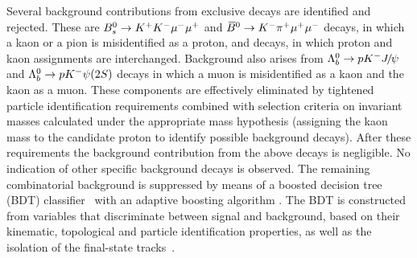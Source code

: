 Several background contributions from exclusive decays are identified and rejected.
These are ${{B}^0_{s}}\rightarrow {\ensuremath{{K}^+}}{\ensuremath{{K}^-}}\mu^-\mu^+$ and ${{\kern 0.18em\overline{\kern -0.18em B}{}}{}^0}\rightarrow {\ensuremath{{K}^-}} {\ensuremath{{\pi}^+}}{\ensuremath{\mu^+}}{\ensuremath{\mu^-}}$ decays, in which a kaon or a pion is
misidentified as a proton, and \LK decays, in which proton and kaon assignments are interchanged.
Background also arises from ${{\Lambda}^0_{b}}\rightarrow p{{K}^-} {{J\mskip -3mu/\mskip -2mu\psi\mskip 2mu}}$ and ${{\Lambda}^0_{b}}\rightarrow p {{K}^-} {\psi{(2S)}}$ decays in which a muon is misidentified as a kaon and the kaon as a muon.
These components are effectively eliminated by tightened particle identification
requirements combined with selection criteria on invariant masses
calculated under the appropriate mass hypothesis (\eg assigning the kaon mass to
the candidate proton to identify possible \BsKKmm background decays).
After these requirements the background contribution from the above decays is negligible. No indication of other specific background decays is observed.
The remaining combinatorial background is suppressed by means of a boosted decision tree (BDT)
classifier~\cite{Breiman,Roe} with an adaptive boosting algorithm \cite{AdaBoost}. The BDT is constructed from variables that discriminate between signal and background, based on their kinematic, topological and particle
identification properties, as well as the isolation of the final-state tracks~\cite{Aaij:2011rja,Aaij:2015bfa}. %
